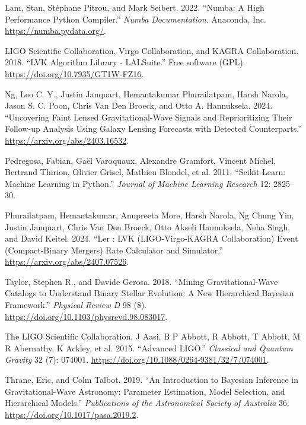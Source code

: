 \documentclass[10pt,a4paper,onecolumn]{article}
\newlength{\cslhangindent}
\newenvironment{CSLReferences}[3] %
 {%
  \setlength{\parindent}{0pt}
  \ifodd #1 \everypar{\setlength{\hangindent}{\cslhangindent}}\ignorespaces\fi
  \ifnum #2 > 0
  \setlength{\parskip}{#2\baselineskip}
  \fi
 }%
 {}
\begin{document}
\begin{CSLReferences}{1}{0}
\bibitem[\citeproctext]{ref-numba}
Lam, Stan, Stéphane Pitrou, and Mark Seibert. 2022. {``Numba: A High
Performance Python Compiler.''} \emph{Numba Documentation}. Anaconda,
Inc. \url{https://numba.pydata.org/}.

LIGO Scientific Collaboration, Virgo Collaboration, and KAGRA
Collaboration. 2018. {``{LVK} {A}lgorithm {L}ibrary - {LALS}uite.''}
Free software (GPL). \url{https://doi.org/10.7935/GT1W-FZ16}.

Ng, Leo C. Y., Justin Janquart, Hemantakumar Phurailatpam, Harsh Narola,
Jason S. C. Poon, Chris Van Den Broeck, and Otto A. Hannuksela. 2024.
{``Uncovering Faint Lensed Gravitational-Wave Signals and Reprioritizing
Their Follow-up Analysis Using Galaxy Lensing Forecasts with Detected
Counterparts.''} \url{https://arxiv.org/abs/2403.16532}.

Pedregosa, Fabian, Gaël Varoquaux, Alexandre Gramfort, Vincent Michel,
Bertrand Thirion, Olivier Grisel, Mathieu Blondel, et al. 2011.
{``Scikit-Learn: Machine Learning in {P}ython.''} \emph{Journal of
Machine Learning Research} 12: 2825--30.

Phurailatpam, Hemantakumar, Anupreeta More, Harsh Narola, Ng Chung Yin,
Justin Janquart, Chris Van Den Broeck, Otto Akseli Hannuksela, Neha
Singh, and David Keitel. 2024. {``Ler : LVK (LIGO-Virgo-KAGRA
Collaboration) Event (Compact-Binary Mergers) Rate Calculator and
Simulator.''} \url{https://arxiv.org/abs/2407.07526}.

Taylor, Stephen R., and Davide Gerosa. 2018. {``Mining
Gravitational-Wave Catalogs to Understand Binary Stellar Evolution: A
New Hierarchical Bayesian Framework.''} \emph{Physical Review D} 98 (8).
\url{https://doi.org/10.1103/physrevd.98.083017}.

The LIGO Scientific Collaboration, J Aasi, B P Abbott, R Abbott, T
Abbott, M R Abernathy, K Ackley, et al. 2015. {``Advanced LIGO.''}
\emph{Classical and Quantum Gravity} 32 (7): 074001.
\url{https://doi.org/10.1088/0264-9381/32/7/074001}.

Thrane, Eric, and Colm Talbot. 2019. {``An Introduction to Bayesian
Inference in Gravitational-Wave Astronomy: Parameter Estimation, Model
Selection, and Hierarchical Models.''} \emph{Publications of the
Astronomical Society of Australia} 36.
\url{https://doi.org/10.1017/pasa.2019.2}.

\end{CSLReferences}
\end{document}
